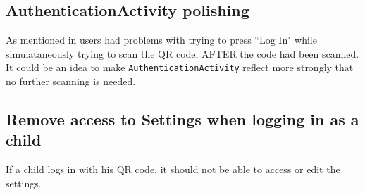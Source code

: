 \subsection{AuthenticationActivity polishing}

As mentioned in  users had problems with trying to press ``Log In" while simulataneously trying to scan the QR code, AFTER the code had been scanned.
It could be an idea to make \lstinline!AuthenticationActivity! reflect more strongly that no further scanning is needed.

\subsection{Remove access to Settings when logging in as a child}

If a child logs in with his QR code, it should not be able to access or edit the settings.